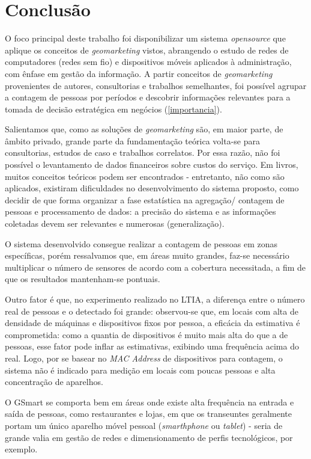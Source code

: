 \chapter{Conclusão}
\label{conclusao}

O foco principal deste trabalho foi disponibilizar um sistema \emph{opensource}
que aplique os conceitos de \emph{geomarketing} vistos, abrangendo o estudo de
redes de computadores (redes sem fio) e dispositivos móveis aplicados à
administração, com ênfase em gestão da informação. A partir conceitos de
\emph{geomarketing} provenientes de autores, consultorias e trabalhos
semelhantes, foi possível agrupar a contagem de pessoas por períodos e descobrir
informações relevantes para a tomada de decisão estratégica em negócios
(\autoref{importancia}).

Salientamos que, como as soluções de \emph{geomarketing}
são, em maior parte, de âmbito privado, grande parte da fundamentação teórica
volta-se para consultorias, estudos de caso e trabalhos correlatos. Por essa
razão, não foi possível o levantamento de dados financeiros sobre custos do serviço. Em livros, muitos conceitos teóricos podem ser encontrados -
entretanto, não como são aplicados, existiram dificuldades no desenvolvimento do
sistema proposto, como decidir de que forma organizar a fase estatística na
agregação/ contagem de pessoas e processamento de dados: a precisão do sistema e
as informações coletadas devem ser relevantes e numerosas (generalização).

O sistema desenvolvido consegue realizar a contagem de pessoas em zonas
específicas, porém ressalvamos que, em áreas muito grandes, faz-se necessário
multiplicar o número de sensores de acordo com a cobertura necessitada, a fim de
que os resultados mantenham-se pontuais.

Outro fator é que, no experimento realizado no LTIA, a diferença entre o número
real de pessoas e o detectado foi grande:  observou-se que, em locais com alta
de densidade de máquinas e dispositivos fixos por pessoa, a eficácia da
estimativa é comprometida: como a quantia de dispositivos é muito mais alta do
que a de pessoas, esse fator pode inflar as estimativas, exibindo uma frequência
acima do real. Logo, por se basear no \emph{MAC Address} de
dispositivos para contagem, o sistema não é indicado para medição em locais com poucas pessoas e alta concentração de aparelhos.

O GSmart se comporta bem em áreas onde existe alta frequência na entrada e saída de pessoas, como
restaurantes e lojas, em que os transeuntes geralmente portam um único aparelho móvel
pessoal (\emph{smarthphone} ou \emph{tablet}) - seria de grande valia em gestão de redes e dimensionamento de perfis tecnológicos, por exemplo.

